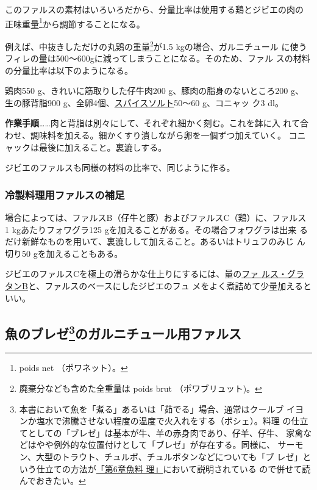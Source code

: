 \begin{recette}
このファルスの素材はいろいろだから、分量比率は使用する鶏とジビエの肉の
正味重量\footnote{poids net （ポワネット）。}から調節することになる。

例えば、中抜きしただけの丸鶏の重量\footnote{廃棄分なども含めた全重量は
  poids brut （ポワブリュット)。}が1.5 kgの場合、ガルニチュール
に使うフィレの量は500〜600gに減ってしまうことになる。そのため、ファル
スの材料の分量比率は以下のようになる。

鶏肉550 g、きれいに筋取りした仔牛肉200 g、豚肉の脂身のないところ200 g、
生の豚背脂900
g、全卵4個、\protect\hyperlink{sel-epice}{スパイスソルト}50〜60
g、コニャッ ク3 dl。

\textbf{作業手順}\ldots{}\ldots{}肉と背脂は別々にして、それぞれ細かく刻む。これを鉢に入
れて合わせ、調味料を加える。細かくすり潰しながら卵を一個ずつ加えていく。
コニャックは最後に加えること。裏漉しする。

ジビエのファルスも同様の材料の比率で、同じように作る。

\hypertarget{observation-sur-les-farces}{%
\subsubsection{冷製料理用ファルスの補足}\label{observation-sur-les-farces}}

場合によっては、ファルスB（仔牛と豚）およびファルスC（鶏）に、ファルス 1
kgあたりフォワグラ125 gを加えることがある。その場合フォワグラは出来
るだけ新鮮なものを用いて、裏漉しして加えること。あるいはトリュフのみじ
ん切り50 gを加えることもある。

ジビエのファルスCを極上の滑らかな仕上りにするには、\unquart{}量の\protect\hyperlink{farce-gratin-b}{ファ
ルス・グラタンB}と、ファルスのベースにしたジビエのフュ
メをよく煮詰めて少量加えるといい。
\end{recette}
\hypertarget{farces-speciales-pour-garnir-les-poissons-braises}{%
\subsection[魚のブレゼのガルニチュール用ファルス]{\texorpdfstring{魚のブレゼ\footnote{本書において魚を「煮る」あるいは「茹でる」場合、通常はクールブ
  イヨンか塩水で沸騰させない程度の温度で火入れをする（ポシェ）。料理
  の仕立てとしての「ブレゼ」は基本が牛、羊の赤身肉であり、仔羊、仔牛、
  家禽などはやや例外的な位置付けとして「ブレゼ」が存在する。同様に、
  サーモン、大型のトラウト、チュルボ、チュルボタンなどについても「ブ
  レゼ」という仕立ての方法が\protect\hyperlink{cuisson-des-poissons-par-le-braisage}{「第6章魚料
  理」}において説明されている ので併せて読んでおきたい。}のガルニチュール用ファルス}{魚のブレゼのガルニチュール用ファルス}}\label{farces-speciales-pour-garnir-les-poissons-braises}}

